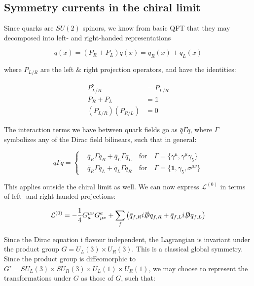 \documentclass[10pt]{report}
\begin{document}
	\subsection{Symmetry currents in the chiral limit}
	Since quarks are $SU(2)$ spinors, we know from basic QFT that they may decomposed into left- and right-handed representations
	
	\begin{equation}
		q(x) = (P_R+P_L)q(x) = q_R(x) + q_L(x)
	\end{equation}
	
	where $P_{L/R}$ are the left \& right projection operators, and have the identities:
	
	\begin{align}
		P_{L/R}^2 &= P_{L/R} \\
		P_{R} + P_{L} &= \mathds{1} \\ 
		\left(P_{L/R}\right)\left(P_{R/L}\right) &= 0
	\end{align}
	
	The interaction terms we have between quark fields go as $\bar{q}\Gamma q$, where $\Gamma$ symbolizes any of the Dirac field bilinears, such that in general:
	
	\begin{equation}
		\bar{q}\Gamma q = \begin{cases}
		&\bar{q}_R\Gamma q_R + \bar{q}_L\Gamma q_L \quad\text{for}\quad \Gamma=\{\gamma^\mu, \gamma^\mu\gamma_5\}\\
		&\bar{q}_R\Gamma q_L + \bar{q}_L\Gamma q_R \quad\text{for}\quad \Gamma=\{\mathds{1}, \gamma_5, \sigma^{\mu\nu}\}
		\end{cases}
	\end{equation}
	
	This applies outside the chiral limit as well. We can now express $\mathcal{L}^{(0)}$ in terms of left- and right-handed projections:
	
	\begin{equation}
		\mathcal{L}^{(0)} = -\frac{1}{4}G_a^{\mu\nu}G_{\mu\nu}^a + \sum_{f} \left( \bar{q}_{f,R}i\slashed Dq_{f,R} + \bar{q}_{f,L}i\slashed Dq_{f,L} \right)
	\end{equation}
	
	Since the Dirac equation i flavour independent, the Lagrangian is invariant under the product group $G=U_L(3)\times U_R(3)$. This is a classical global symmetry. Since the product group is diffeomorphic to $G'=SU_L(3)\times SU_R(3)\times U_L(1)\times U_R(1)$, we may choose to represent the transformations under $G$ as those of $G$, such that:
	
\end{document}
